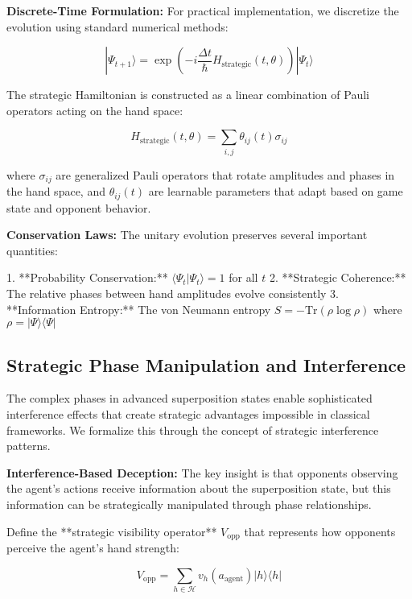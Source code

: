 \documentclass[11pt,a4paper]{article}
\begin{document}
\textbf{Discrete-Time Formulation:} For practical implementation, we discretize the evolution using standard numerical methods:

\begin{equation}
|\Psi_{t+1}\rangle = \exp\left(-i \frac{\Delta t}{\hbar} H_{\text{strategic}}(t, \theta)\right) |\Psi_t\rangle
\end{equation}

The strategic Hamiltonian is constructed as a linear combination of Pauli operators acting on the hand space:

\begin{equation}
H_{\text{strategic}}(t, \theta) = \sum_{i,j} \theta_{ij}(t) \sigma_{ij}
\end{equation}

where $\sigma_{ij}$ are generalized Pauli operators that rotate amplitudes and phases in the hand space, and $\theta_{ij}(t)$ are learnable parameters that adapt based on game state and opponent behavior.

\textbf{Conservation Laws:} The unitary evolution preserves several important quantities:

1. **Probability Conservation:** $\langle \Psi_t | \Psi_t \rangle = 1$ for all $t$
2. **Strategic Coherence:** The relative phases between hand amplitudes evolve consistently
3. **Information Entropy:** The von Neumann entropy $S = -\text{Tr}(\rho \log \rho)$ where $\rho = |\Psi\rangle\langle\Psi|$

\subsection{Strategic Phase Manipulation and Interference}

The complex phases in advanced superposition states enable sophisticated interference effects that create strategic advantages impossible in classical frameworks. We formalize this through the concept of strategic interference patterns.

\textbf{Interference-Based Deception:} The key insight is that opponents observing the agent's actions receive information about the superposition state, but this information can be strategically manipulated through phase relationships.

Define the **strategic visibility operator** $V_{\text{opp}}$ that represents how opponents perceive the agent's hand strength:

\begin{equation}
V_{\text{opp}} = \sum_{h \in \mathcal{H}} v_h(a_{\text{agent}}) |h\rangle\langle h|
\end{equation}
\end{document}
